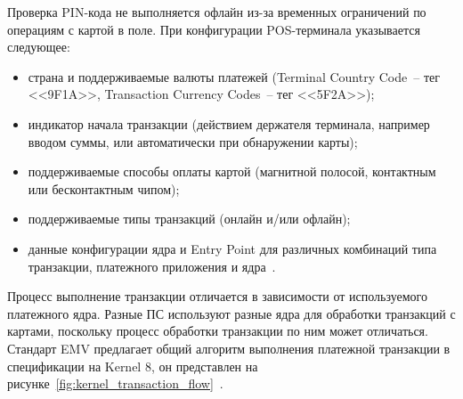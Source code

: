 Проверка PIN-кода не выполняется офлайн из-за временных ограничений по операциям с картой в поле.
При конфигурации POS-терминала указывается следующее:

\begin{itemize}
    \item страна и поддерживаемые валюты платежей (Terminal Country Code~-- тег <<9F1A>>, Transaction Currency Codes~-- тег <<5F2A>>);
    \item индикатор начала транзакции (действием держателя терминала, например вводом суммы, или автоматически при обнаружении карты);
    \item поддерживаемые способы оплаты картой (магнитной полосой, контактным или бесконтактным чипом);
    \item поддерживаемые типы транзакций (онлайн и/или офлайн);
    \item данные конфигурации ядра и Entry Point для различных комбинаций типа транзакции, платежного приложения и ядра~\cite{emv_book_A}.
\end{itemize}

Процесс выполнение транзакции отличается в зависимости от используемого платежного ядра.
Разные ПС используют разные ядра для обработки транзакций с картами, поскольку процесс обработки транзакции по ним может отличаться.
Стандарт EMV предлагает общий алгоритм выполнения платежной транзакции в спецификации на Kernel 8, он представлен на рисунке~\ref{fig:kernel_transaction_flow}~\cite{emv_book_c8}.

